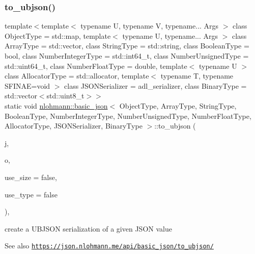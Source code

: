 \subsubsection{\texorpdfstring{to\+\_\+ubjson()}{to\_ubjson()}\hspace{0.1cm}{\footnotesize\ttfamily [3/3]}}
{\footnotesize\ttfamily template$<$template$<$ typename U, typename V, typename... Args $>$ class Object\+Type = std\+::map, template$<$ typename U, typename... Args $>$ class Array\+Type = std\+::vector, class String\+Type  = std\+::string, class Boolean\+Type  = bool, class Number\+Integer\+Type  = std\+::int64\+\_\+t, class Number\+Unsigned\+Type  = std\+::uint64\+\_\+t, class Number\+Float\+Type  = double, template$<$ typename U $>$ class Allocator\+Type = std\+::allocator, template$<$ typename T, typename S\+F\+I\+N\+A\+E=void $>$ class J\+S\+O\+N\+Serializer = adl\+\_\+serializer, class Binary\+Type  = std\+::vector$<$std\+::uint8\+\_\+t$>$$>$ \\
static void \hyperlink{classnlohmann_1_1basic__json}{nlohmann\+::basic\+\_\+json}$<$ Object\+Type, Array\+Type, String\+Type, Boolean\+Type, Number\+Integer\+Type, Number\+Unsigned\+Type, Number\+Float\+Type, Allocator\+Type, J\+S\+O\+N\+Serializer, Binary\+Type $>$\+::to\+\_\+ubjson (\begin{DoxyParamCaption}\item[{const \hyperlink{classnlohmann_1_1basic__json}{basic\+\_\+json}$<$ Object\+Type, Array\+Type, String\+Type, Boolean\+Type, Number\+Integer\+Type, Number\+Unsigned\+Type, Number\+Float\+Type, Allocator\+Type, J\+S\+O\+N\+Serializer, Binary\+Type $>$ \&}]{j,  }\item[{\hyperlink{classnlohmann_1_1detail_1_1output__adapter}{detail\+::output\+\_\+adapter}$<$ char $>$}]{o,  }\item[{const bool}]{use\+\_\+size = {\ttfamily false},  }\item[{const bool}]{use\+\_\+type = {\ttfamily false} }\end{DoxyParamCaption})\hspace{0.3cm}{\ttfamily [inline]}, {\ttfamily [static]}}



create a U\+B\+J\+S\+ON serialization of a given J\+S\+ON value 

\begin{DoxySeeAlso}{See also}
\href{https://json.nlohmann.me/api/basic_json/to_ubjson/}{\tt https\+://json.\+nlohmann.\+me/api/basic\+\_\+json/to\+\_\+ubjson/} 
\end{DoxySeeAlso}
\mbox{\label{classnlohmann_1_1basic__json_a5b7c4b35a0ad9f97474912a08965d7ad}} 
